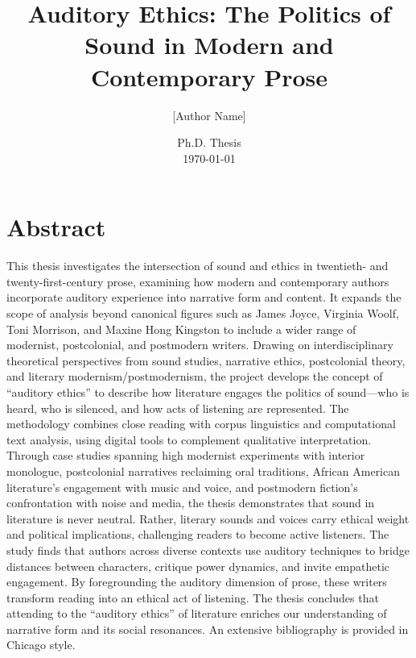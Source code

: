 \documentclass[12pt]{report}
\begin{document}
\title{\textbf{Auditory Ethics: The Politics of Sound in Modern and Contemporary Prose}}
\author{[Author Name]}
\date{Ph.D. Thesis \\ \today}
\maketitle

\tableofcontents

\chapter*{Abstract}
This thesis investigates the intersection of sound and ethics in twentieth- and twenty-first-century prose, examining how modern and contemporary authors incorporate auditory experience into narrative form and content. It expands the scope of analysis beyond canonical figures such as James Joyce, Virginia Woolf, Toni Morrison, and Maxine Hong Kingston to include a wider range of modernist, postcolonial, and postmodern writers. Drawing on interdisciplinary theoretical perspectives from sound studies, narrative ethics, postcolonial theory, and literary modernism/postmodernism, the project develops the concept of “auditory ethics” to describe how literature engages the politics of sound—who is heard, who is silenced, and how acts of listening are represented. The methodology combines close reading with corpus linguistics and computational text analysis, using digital tools to complement qualitative interpretation. Through case studies spanning high modernist experiments with interior monologue, postcolonial narratives reclaiming oral traditions, African American literature’s engagement with music and voice, and postmodern fiction’s confrontation with noise and media, the thesis demonstrates that sound in literature is never neutral. Rather, literary sounds and voices carry ethical weight and political implications, challenging readers to become active listeners. The study finds that authors across diverse contexts use auditory techniques to bridge distances between characters, critique power dynamics, and invite empathetic engagement. By foregrounding the auditory dimension of prose, these writers transform reading into an ethical act of listening. The thesis concludes that attending to the “auditory ethics” of literature enriches our understanding of narrative form and its social resonances. An extensive bibliography is provided in Chicago style. 
\end{document}
